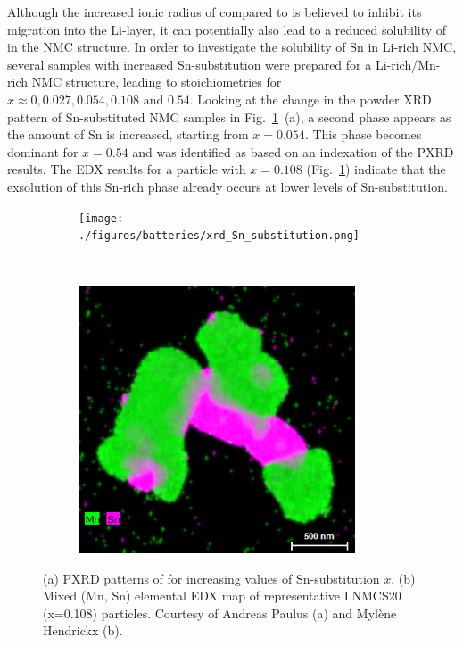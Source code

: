 \begin{refsection}
Although the increased ionic radius of  compared to  
is believed to inhibit its migration into the Li-layer, it can potentially 
also lead to a reduced solubility of  in the NMC structure. In order to 
investigate the solubility of Sn in Li-rich NMC, several samples with 
increased Sn-substitution were prepared for a Li-rich/Mn-rich NMC structure, 
leading to stoichiometries  
for $x  \approx 0, 0.027, 0.054, 0.108 \textrm{ and } 0.54$. Looking at the 
change in the powder XRD pattern of Sn-substituted NMC samples in 
Fig.~\ref{batteries:fig-Sn_experiment}~(a), a second phase appears as the 
amount of Sn is increased, starting from $x = 0.054$. This phase becomes dominant for $x=0.54$ and was 
identified as  based on an indexation of the PXRD results. 
The EDX results for a particle with $x=0.108$ 
(Fig.~\ref{batteries:fig-Sn_experiment}) indicate that the exsolution of this 
Sn-rich phase already occurs at lower levels of Sn-substitution. 
 
\begin{figure}[ht] 
    \centering
    \captionsetup{width=0.92\linewidth}
    \begin{subfigure}[t]{0.65\textwidth} 
        \centering 
        \texttt{[image: ./figures/batteries/xrd\_Sn\_substitution.png]} 
        \caption{} 
    \end{subfigure}%
    ~  
    \begin{subfigure}[t]{0.34\textwidth} 
        \centering 
        \includegraphics[width=0.9\textwidth]{./figures/batteries/edx_Sn_substitution.png} 
        \caption{} 
    \end{subfigure} 
    \caption{(a) PXRD patterns of 
 for increasing values of 
Sn-substitution $x$. (b) Mixed (Mn, Sn) elemental EDX map of representative 
LNMCS20 (x=0.108) particles. Courtesy of Andreas Paulus (a) and Myl\`ene 
Hendrickx (b).} 
    \label{batteries:fig-Sn_experiment} 
\end{figure} 
 

\end{refsection}
